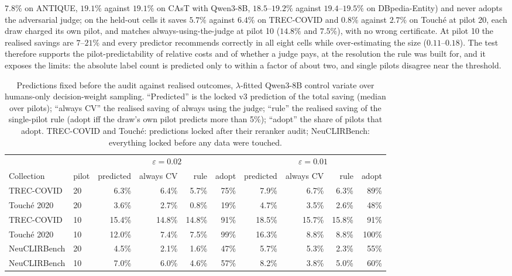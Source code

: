 \documentclass{article}
\newcommand{\eps}{\varepsilon}
\begin{document}
$7.8\%$ on ANTIQUE, $19.1\%$ against $19.1\%$ on CAsT with Qwen3-8B, $18.5$--$19.2\%$ against $19.4$--$19.5\%$ on DBpedia-Entity) and never adopts the adversarial judge; on the held-out cells it saves $5.7\%$ against $6.4\%$ on TREC-COVID and $0.8\%$ against $2.7\%$ on Touch\'e at pilot 20, each draw charged its own pilot, and matches always-using-the-judge at pilot 10 ($14.8\%$ and $7.5\%$), with no wrong certificate. At pilot 10 the realised savings are $7$--$21\%$ and every predictor recommends correctly in all eight cells while over-estimating the size ($0.11$--$0.18$). The test therefore supports the pilot-predictability of relative costs and of whether a judge pays, at the resolution the rule was built for, and it exposes the limits: the absolute label count is predicted only to within a factor of about two, and single pilots disagree near the threshold.

\begin{table}[t]\centering\footnotesize\setlength{\tabcolsep}{4pt}
\caption{Predictions fixed before the audit against realised outcomes, $\lambda$-fitted Qwen3-8B control variate over humans-only decision-weight sampling. ``Predicted'' is the locked v3 prediction of the total saving (median over pilots); ``always CV'' the realised saving of always using the judge; ``rule'' the realised saving of the single-pilot rule (adopt iff the draw's own pilot predicts more than 5\%); ``adopt'' the share of pilots that adopt. TREC-COVID and Touch\'e: predictions locked after their reranker audit; NeuCLIRBench: everything locked before any data were touched.}\label{tab:heldout}
\begin{tabular}{llrrrr rrrr}\toprule
 & & \multicolumn{4}{c}{$\eps=0.02$} & \multicolumn{4}{c}{$\eps=0.01$}\\
Collection & pilot & predicted & always CV & rule & adopt & predicted & always CV & rule & adopt\\\midrule
TREC-COVID & 20 & 6.3\% & 6.4\% & 5.7\% & 75\% & 7.9\% & 6.7\% & 6.3\% & 89\%\\
Touch\'e 2020 & 20 & 3.6\% & 2.7\% & 0.8\% & 19\% & 4.7\% & 3.5\% & 2.6\% & 48\%\\
TREC-COVID & 10 & 15.4\% & 14.8\% & 14.8\% & 91\% & 18.5\% & 15.7\% & 15.8\% & 91\%\\
Touch\'e 2020 & 10 & 12.0\% & 7.4\% & 7.5\% & 99\% & 16.3\% & 8.8\% & 8.8\% & 100\%\\\midrule
NeuCLIRBench & 20 & 4.5\% & 2.1\% & 1.6\% & 47\% & 5.7\% & 5.3\% & 2.3\% & 55\%\\
NeuCLIRBench & 10 & 7.0\% & 6.0\% & 4.6\% & 57\% & 8.2\% & 3.8\% & 5.0\% & 60\%\\\bottomrule
\end{tabular}
\end{table}
\end{document}
